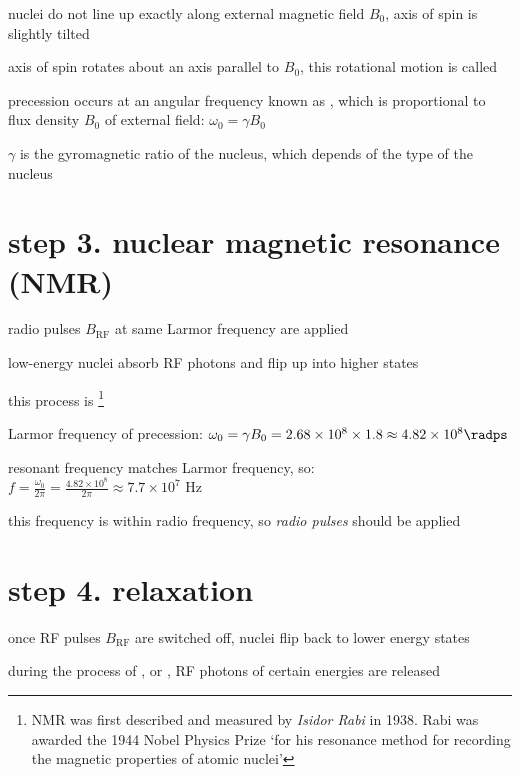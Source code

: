nuclei do not line up exactly along external magnetic field $B_0$, axis of spin is slightly tilted

axis of spin rotates about an axis parallel to $B_0$, this rotational motion is called 

precession occurs at an angular frequency known as , which is proportional to flux density $B_0$ of external field: $\boxed{\omega_0 = \gamma B_0}$

$\gamma$ is the gyromagnetic ratio of the nucleus, which depends of the type of the nucleus

\section*{step 3. nuclear magnetic resonance (NMR)}

radio pulses $B_\text{RF}$ at same Larmor frequency are applied

low-energy nuclei absorb RF photons and flip up into higher states

this process is  \footnote{NMR was first described and measured by \emph{Isidor Rabi} in 1938. Rabi was awarded the 1944 Nobel Physics Prize `for his resonance method for recording the magnetic properties of atomic nuclei'}


\sol Larmor frequency of precession: $\omega_0 = \gamma B_0 = 2.68\times10^8 \times 1.8 \approx 4.82\times 10^8 \radps$

resonant frequency matches Larmor frequency, so: $f=\frac{\omega_0}{2\pi} = \frac{4.82\times 10^8}{2\pi} \approx 7.7\times10^7 \text{ Hz}$

this frequency is within radio frequency, so \emph{radio pulses} should be applied \eoe


\section*{step 4. relaxation}

once RF pulses $B_\text{RF}$ are switched off, nuclei flip back to lower energy states

during the process of , or , RF photons of certain energies are released

